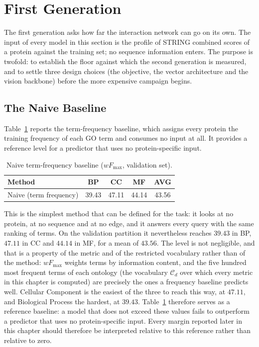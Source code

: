 \documentclass[Ingles]{ic-tese-v3}
\begin{document}

\section{First Generation}
\label{sec:geracao1}

The first generation asks how far the interaction network can go on its own. The input of
every model in this section is the profile of STRING combined scores of a protein against
the training set; no sequence information enters. The purpose is twofold: to establish the
floor against which the second generation is measured, and to settle three design choices
(the objective, the vector architecture and the vision backbone) before the more
expensive campaign begins.

\subsection{The Naive Baseline}

Table~\ref{tab:naive} reports the term-frequency baseline, which assigns every protein the
training frequency of each GO term and consumes no input at all. It provides a reference level for a predictor that uses no protein-specific input.

\begin{table}[!htb]
  \centering
  \caption{Naive term-frequency baseline ($wF_{\max}$, validation set).}
  \label{tab:naive}
  \begin{tabular}{lcccc}
    \toprule
    Method & BP & CC & MF & AVG \\
    \midrule
    Naive (term frequency) & 39.43 & 47.11 & 44.14 & 43.56 \\
    \bottomrule
  \end{tabular}
\end{table}

This is the simplest method that can be defined for the task: it looks at no protein, at no
sequence and at no edge, and it answers every query with the same ranking of terms. On the
validation partition it nevertheless reaches $39.43$ in BP, $47.11$ in CC and $44.14$ in MF,
for a mean of $43.56$. The level is not negligible, and that is a property of the metric and
of the restricted vocabulary rather than of the method: $wF_{\max}$ weights terms by
information content, and the five hundred most frequent terms of each ontology (the
vocabulary $\mathcal{C}_d$ over which every metric in this chapter is computed) are
precisely the ones a frequency baseline predicts well. Cellular Component is the easiest of
the three to reach this way, at $47.11$, and Biological Process the hardest, at $39.43$.
Table~\ref{tab:naive} therefore serves as a reference baseline: a model that does not exceed these values fails to outperform a predictor that uses no protein-specific input. Every margin reported later in this chapter should therefore be interpreted relative to this reference rather than relative to zero.
\end{document}
